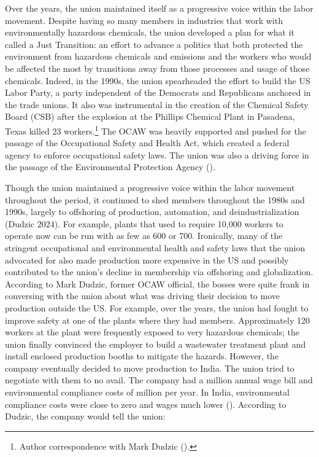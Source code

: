 \documentclass[12pt]{article}
\begin{document}
Over the years, the union maintained itself as a progressive voice within the labor movement. Despite having so many members in industries that work with environmentally hazardous chemicals, the union developed a plan for what it called a Just Transition: an effort to advance a politics that both protected the environment from hazardous chemicals and emissions and the workers who would be affected the most by transitions away from those processes and usage of those chemicals. Indeed, in the 1990s, the union spearheaded the effort to build the US Labor Party, a party independent of the Democrats and Republicans anchored in the trade unions. It also was instrumental in the creation of the Chemical Safety Board (CSB) after the explosion at the Phillips Chemical Plant in Pasadena, Texas killed 23 workers.\footnote{Author correspondence with Mark Dudzic (\citeyear{dudzicInterview2024}).} The OCAW was heavily supported and pushed for the passage of the Occupational Safety and Health Act, which created a federal agency to enforce occupational safety laws. The union was also a driving force in the passage of the Environmental Protection Agency (\cite{leopoldManWhoHated2007}).

Though the union maintained a progressive voice within the labor movement throughout the period, it continued to shed members throughout the 1980s and 1990s, largely to offshoring of production, automation, and deindustrialization (Dudzic 2024). For example, plants that used to require 10,000 workers to operate now can be run with as few as 600 or 700. Ironically, many of the stringent occupational and environmental health and safety laws that the union advocated for also made production more expensive in the US and possibly contributed to the union’s decline in membership via offshoring and globalization. According to Mark Dudzic, former OCAW official, the bosses were quite frank in conversing with the union about what was driving their decision to move production outside the US. For example, over the years, the union had fought to improve safety at one of the plants where they had members. Approximately 120 workers at the plant were frequently exposed to very hazardous chemicals; the union finally convinced the employer to build a wastewater treatment plant and install enclosed production booths to mitigate the hazards. However, the company eventually decided to move production to India. The union tried to negotiate with them to no avail. The company had a   million annual wage bill and environmental compliance costs of   million per year. In India, environmental compliance costs were close to zero and wages much lower (\cite{dudzicInterview2024}). According to Dudzic, the company would tell the union:
\end{document}
